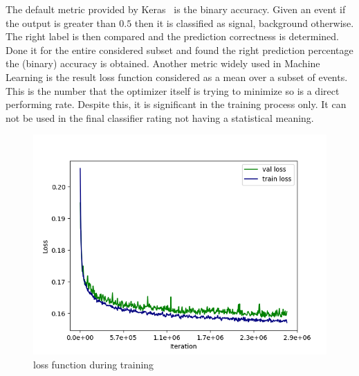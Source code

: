 The default metric provided by Keras~\cite{keras} is the binary accuracy.
Given an event if the output is greater than $0.5$ then it is classified
as signal, background otherwise. The right label is then compared and the
prediction correctness is determined. Done it for the entire considered
subset and found the right prediction percentage  the (binary) accuracy
is obtained.
Another metric widely used in Machine Learning is the result loss function
considered as a mean over a subset of events. This is the number that the
optimizer itself is trying to minimize so is a direct performing rate.
Despite this, it is significant in the training process only. It can not be
used in the final classifier rating not having a statistical meaning.
\begin{figure}[h]
 \centering
 \includegraphics[scale=0.4]{figures/loss_tv.png}
 \caption{loss function during training}
\end{figure}

